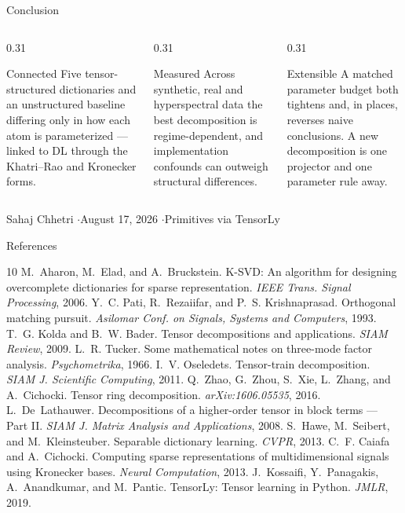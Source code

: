 \documentclass[aspectratio=169,9pt]{beamer}
\begin{document}
\begin{frame}{Conclusion}
\begin{columns}[T,onlytextwidth]
\begin{column}{0.31\textwidth}
\begin{block}{Connected}
\small Five tensor-structured dictionaries and an unstructured baseline differing
only in how each atom is parameterized --- linked to DL through the Khatri--Rao
and Kronecker forms.
\end{block}
\end{column}
\begin{column}{0.31\textwidth}
\begin{block}{Measured}
\small Across synthetic, real and hyperspectral data the best decomposition is
regime-dependent, and implementation confounds can outweigh structural
differences.
\end{block}
\end{column}
\begin{column}{0.31\textwidth}
\begin{block}{Extensible}
\small A matched parameter budget both tightens and, in places, reverses naive
conclusions. A new decomposition is one projector and one parameter rule away.
\end{block}
\end{column}
\end{columns}
\vfill
\centering\small Sahaj Chhetri \quad$\cdot$\quad August 17, 2026
\quad$\cdot$\quad Primitives via TensorLy
\end{frame}

\begin{frame}[allowframebreaks]{References}
\footnotesize
\begin{thebibliography}{10}
 M.~Aharon, M.~Elad, and A.~Bruckstein. K-SVD: An algorithm for
  designing overcomplete dictionaries for sparse representation.
  \emph{IEEE Trans. Signal Processing}, 2006.
 Y.~C. Pati, R.~Rezaiifar, and P.~S. Krishnaprasad. Orthogonal
  matching pursuit. \emph{Asilomar Conf. on Signals, Systems and Computers}, 1993.
 T.~G. Kolda and B.~W. Bader. Tensor decompositions and
  applications. \emph{SIAM Review}, 2009.
 L.~R. Tucker. Some mathematical notes on three-mode factor
  analysis. \emph{Psychometrika}, 1966.
 I.~V. Oseledets. Tensor-train decomposition.
  \emph{SIAM J. Scientific Computing}, 2011.
 Q.~Zhao, G.~Zhou, S.~Xie, L.~Zhang, and A.~Cichocki. Tensor ring
  decomposition. \emph{arXiv:1606.05535}, 2016.
 L.~De~Lathauwer. Decompositions of a higher-order tensor in block
  terms --- Part II. \emph{SIAM J. Matrix Analysis and Applications}, 2008.
 S.~Hawe, M.~Seibert, and M.~Kleinsteuber. Separable dictionary
  learning. \emph{CVPR}, 2013.
 C.~F. Caiafa and A.~Cichocki. Computing sparse representations of
  multidimensional signals using Kronecker bases. \emph{Neural Computation}, 2013.
 J.~Kossaifi, Y.~Panagakis, A.~Anandkumar, and M.~Pantic.
  TensorLy: Tensor learning in Python. \emph{JMLR}, 2019.
\end{thebibliography}
\end{frame}
\end{document}

